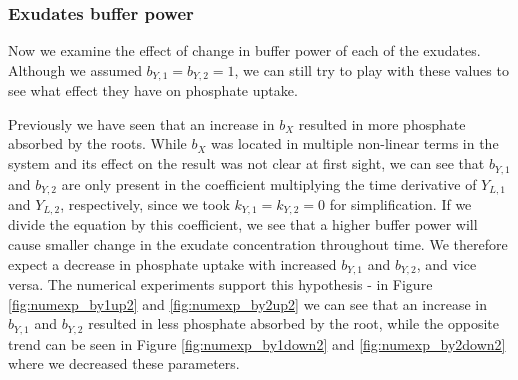 \documentclass[11pt]{article}
\numberwithin{equation}{section}
\begin{document}
\subsubsection{Exudates buffer power}
Now we examine the effect of change in buffer power of each of the exudates. Although we assumed $b_{Y,1}=b_{Y,2}=1$, we can still try to play with these values to see what effect they have on phosphate uptake. 

Previously we have seen that an increase in $b_X$ resulted in more phosphate absorbed by the roots. While $b_X$ was located in multiple non-linear terms in the system and its effect on the result was not clear at first sight, we can see that $b_{Y,1}$ and $b_{Y,2}$ are only present in the coefficient multiplying the time derivative of $Y_{L,1}$ and $Y_{L,2}$, respectively, since we took $k_{Y,1}=k_{Y,2}=0$ for simplification. If we divide the equation by this coefficient, we see that a higher buffer power will cause smaller change in the exudate concentration throughout time. We therefore expect a decrease in phosphate uptake with increased $b_{Y,1}$ and $b_{Y,2}$, and vice versa. The numerical experiments support this hypothesis - in Figure \ref{fig:numexp_by1up2} and \ref{fig:numexp_by2up2} we can see that an increase in $b_{Y,1}$ and $b_{Y,2}$ resulted in less phosphate absorbed by the root, while the opposite trend can be seen in Figure \ref{fig:numexp_by1down2} and \ref{fig:numexp_by2down2} where we decreased these parameters. 
\end{document}
